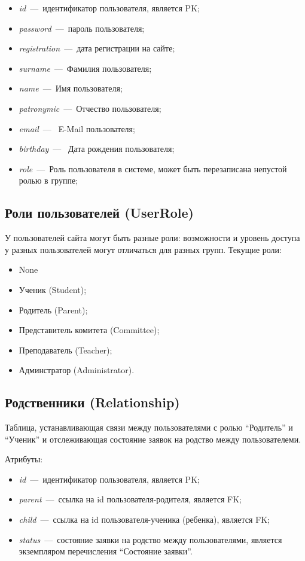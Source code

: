 \documentclass[14pt]{article}
\begin{document}
\begin{itemize}
	\item \emph{id}~---~идентификатор пользователя, является PK;
	\item \emph{password}~---~пароль пользователя;
	\item \emph{registration}~---~дата регистрации на сайте;
	\item \emph{surname}~---~Фамилия пользователя;
	\item \emph{name}~---~Имя пользователя;
	\item \emph{patronymic}~---~Отчество пользователя;
	\item \emph{email}~---~ E-Mail пользователя;
	\item \emph{birthday}~---~ Дата рождения пользователя;
    \item \emph{role}~---~Роль пользователя в системе, может быть перезаписана непустой ролью в группе;
\end{itemize}

\subsection{Роли пользователей (UserRole)}

У пользователей сайта могут быть разные роли: возможности и уровень доступа у разных пользователей могут отличаться для разных групп.
Текущие роли:
\begin{itemize}
    \item None
	\item Ученик (Student);
	\item Родитель (Parent);
	\item Представитель комитета (Committee);
	\item Преподаватель (Teacher);
	\item Админстратор (Administrator).
\end{itemize}

\subsection{Родственники (Relationship)}

Таблица, устанавливающая связи между пользователями с ролью ``Родитель'' и ``Ученик'' и отслеживающая состояние заявок на родство между пользователеми.

Атрибуты:
\begin{itemize}
	\item \emph{id}~---~идентификатор пользователя, является PK;
	\item \emph{parent}~---~ссылка на id пользователя-родителя, является FK;
	\item \emph{child}~---~ссылка на id пользователя-ученика (ребенка), является FK;
	\item \emph{status}~---~состояние заявки на родство между пользователями, является экземпляром перечисления ``Состояние заявки''.
\end{itemize}
\end{document}
